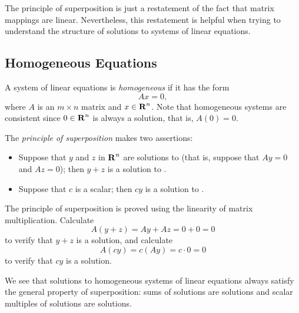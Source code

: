 The principle of superposition is just a restatement of the fact
that matrix mappings are linear.  Nevertheless, this restatement
is helpful when trying to understand the structure of solutions
to systems of linear equations.

\subsection*{Homogeneous Equations}

A system of linear equations is {\em homogeneous\/} if it has
the form
\begin{equation} \label{homosys}
Ax=0,
\end{equation}
where $A$ is an $m\times n$ matrix and $x\in\mbox{$\bf{R}$}^n$.  Note that
homogeneous systems are consistent since $0\in\mbox{$\bf{R}$}^n$ is always a
solution, that is, $A(0)=0$.

The {\em principle of superposition\/}   makes two assertions:
\begin{itemize}
\item  Suppose that $y$ and $z$ in $\mbox{$\bf{R}$}^n$ are solutions to 
(that is, suppose that $Ay=0$ and $Az=0$); then $y+z$ is a solution
to .
\item Suppose that $c$ is a scalar; then $cy$ is a solution to
.
\end{itemize}
The principle of superposition is proved using the linearity of matrix 
multiplication.  Calculate
\[
A(y+z) = Ay + Az = 0+0=0
\]
to verify that $y+z$ is a solution, and calculate
\[
A(cy) = c(Ay) = c\cdot 0 = 0
\]
to verify that $cy$ is a solution.

We see that solutions to homogeneous systems of linear equations
always satisfy the general property of superposition: sums of
solutions are solutions and scalar multiples of solutions are
solutions.

